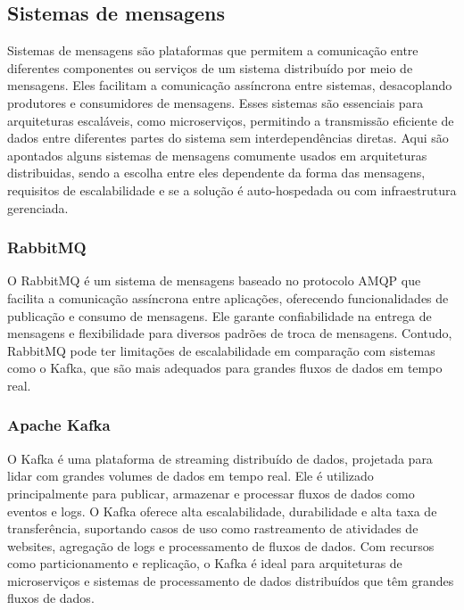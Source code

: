 \subsection{Sistemas de mensagens}
Sistemas de mensagens são plataformas que permitem a comunicação entre diferentes componentes ou serviços de um sistema distribuído por meio de mensagens. Eles facilitam a comunicação assíncrona entre sistemas, desacoplando produtores e consumidores de mensagens. Esses sistemas são essenciais para arquiteturas escaláveis, como microserviços, permitindo a transmissão eficiente de dados entre diferentes partes do sistema sem interdependências diretas. Aqui são apontados alguns sistemas de mensagens comumente usados em arquiteturas distribuidas, sendo a escolha entre eles dependente da forma das mensagens, requisitos de escalabilidade e se a solução é auto-hospedada ou com infraestrutura gerenciada.

\subsubsection*{RabbitMQ}

O RabbitMQ é um sistema de mensagens baseado no protocolo AMQP que facilita a comunicação assíncrona entre aplicações, oferecendo funcionalidades de publicação e consumo de mensagens. Ele garante confiabilidade na entrega de mensagens e flexibilidade para diversos padrões de troca de mensagens. Contudo, RabbitMQ pode ter limitações de escalabilidade em comparação com sistemas como o Kafka, que são mais adequados para grandes fluxos de dados em tempo real.

\subsubsection*{Apache Kafka}
O Kafka é uma plataforma de streaming distribuído de dados, projetada para lidar com grandes volumes de dados em tempo real. Ele é utilizado principalmente para publicar, armazenar e processar fluxos de dados como eventos e logs. O Kafka oferece alta escalabilidade, durabilidade e alta taxa de transferência, suportando casos de uso como rastreamento de atividades de websites, agregação de logs e processamento de fluxos de dados. Com recursos como particionamento e replicação, o Kafka é ideal para arquiteturas de microserviços e sistemas de processamento de dados distribuídos que têm grandes fluxos de dados.

